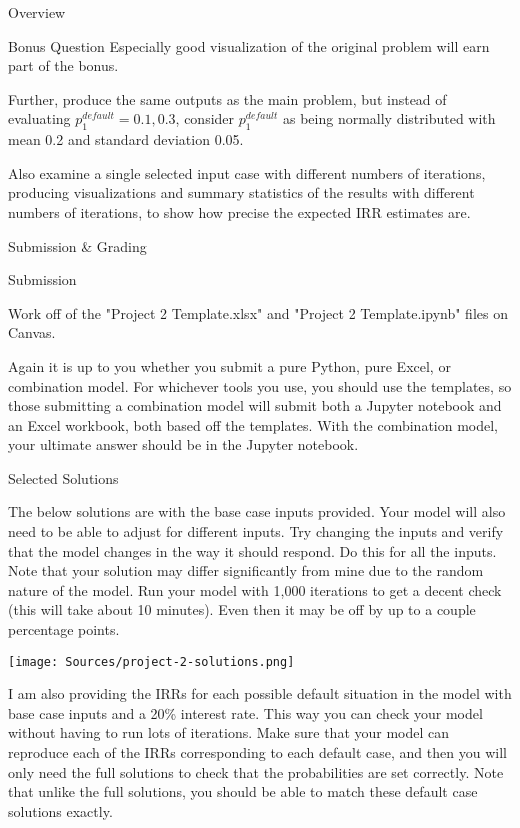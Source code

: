 \documentclass[]{article}
\begin{document}
\begin{section}{Overview}
\begin{subsection}{Bonus Question}
    Especially good visualization of the original problem will earn part of the bonus.
    
    Further, produce the same outputs as the main problem, but instead of evaluating 
    $p_1^{default} = 0.1, 0.3$, consider $p_1^{default}$ as being normally
    distributed with mean 0.2 and standard deviation 0.05.

    Also examine a single selected input case with different numbers of iterations, producing visualizations and 
    summary statistics of the results with different numbers of iterations, to show how precise the expected IRR 
    estimates are.
    
\end{subsection}
\end{section}
\begin{section}{Submission \& Grading}
\begin{subsection}{Submission}

    Work off of the "Project 2 Template.xlsx" and "Project 2 Template.ipynb" files on Canvas. 

    Again it is up to you whether you submit a pure Python, pure Excel, or combination model. For whichever tools
    you use, you should use the templates, so those submitting a combination model will submit both a Jupyter notebook
    and an Excel workbook, both based off the templates. With the combination model, your ultimate answer should be
    in the Jupyter notebook.
    
\end{subsection}
\begin{subsection}{Selected Solutions}

    The below solutions are with the base case inputs provided. Your model will also need to be able to adjust for
    different inputs. Try changing the inputs and verify that the model changes in the way it should respond. Do 
    this for all the inputs. Note that your solution may differ significantly from mine due to the random nature of the 
    model. Run your model with 1,000 iterations to get a decent check (this will take about 10 minutes). Even then it may be 
    off by up to a couple percentage points.
    
\begin{center}
\texttt{[image: Sources/project-2-solutions.png]}
\end{center}

    I am also providing the IRRs for each possible default situation in the model with base case inputs 
    and a 20\% interest rate. This way you
    can check your model without having to run lots of iterations. Make sure that your model can reproduce each of the
    IRRs corresponding to each default case, and then you will only need the full solutions to check that the probabilities
    are set correctly. Note that unlike the full solutions, you should be able to match these default case solutions 
    exactly.
    

\end{subsection}
\end{section}
\end{document}
